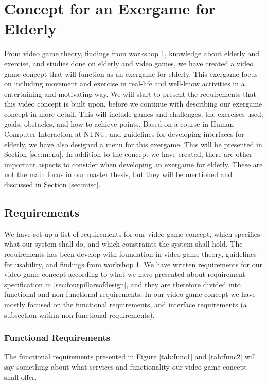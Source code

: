 \chapter{Concept for an Exergame for Elderly}
From video game theory, findings from workshop 1, knowledge about elderly and exercise, and studies done on elderly and video games, we have created a video game concept that will function as an exergame for elderly. This exergame focus on including movement and exercise in real-life and well-know activities in a entertaining and motivating way. We will start to present the requirements that this video concept is built upon, before we continue with describing our exergame concept in more detail. This will include games and challenges, the exercises used, goals, obstacles, and how to achieve points. Based on a course in Human-Computer Interaction at NTNU, and guidelines for developing interfaces for elderly, we have also designed a menu for this exergame. This will be presented in Section \ref{sec:menu}. In addition to the concept we have created, there are other important aspects to consider when developing an exergame for elderly. These are not the main focus in our master thesis, but they will be mentioned and discussed in Section \ref{sec:misc}.

\section{Requirements}
\label{sec:req}
We have set up a list of requirements for our video game concept, which specifies what our system shall do, and which constraints the system shall hold. The requirements has been develop with foundation in video game theory, guidelines for usability, and findings from workshop 1. We have written requirements for our video game concept according to what we have presented about requirement specification in \ref{sec:fourpillarsofdesign}, and they are therefore divided into functional and non-functional requirements. In our video game concept we have mostly focused on the functional requirements, and interface requirements (a subsection within non-functional requirements).

\subsection{Functional Requirements}
The functional requirements presented in Figure \ref{tab:func1} and \ref{tab:func2} will say something about what services and functionality our video game concept shall offer.

